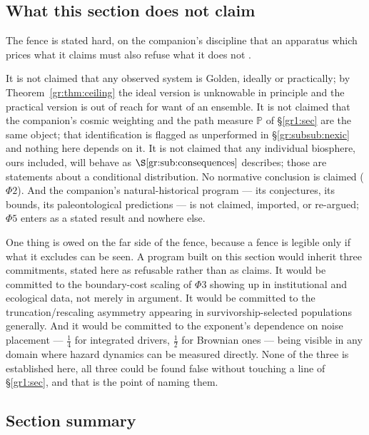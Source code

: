 \documentclass[11pt]{article}
\numberwithin{equation}{section}
\theoremstyle{plain}
\theoremstyle{definition}
\theoremstyle{remark}
\newcommand{\PP}{\mathbb{P}}
\begin{document}
\subsection{What this section does not claim}\label{gr:sub:fence}

The fence is stated hard, on the companion's discipline that an
apparatus which prices what it claims must also refuse what it does not
\cite{Ben26Optimal}.

It is not claimed that any observed system is Golden, ideally or
practically; by Theorem~\ref{gr:thm:ceiling} the ideal version is
unknowable in principle and the practical version is out of reach for
want of an ensemble. It is not claimed that the companion's cosmic
weighting and the path measure $\PP$ of
\S\ref{gr1:sec} are the same object; that
identification is flagged as unperformed in
\S\ref{gr:subsub:nexic} and nothing here depends on it. It is not
claimed that any individual biosphere, ours included, will behave as
$\S\ref{gr:sub:consequences}$ describes; those are statements about a
conditional distribution. No normative conclusion is claimed
($\Phi2$). And the companion's natural-historical program --- its
conjectures, its bounds, its paleontological predictions --- is not
claimed, imported, or re-argued; $\Phi5$ enters as a stated result and
nowhere else.

One thing is owed on the far side of the fence, because a fence is
legible only if what it excludes can be seen. A program built on this
section would inherit three commitments, stated here as refusable rather
than as claims. It would be committed to the boundary-cost scaling of
$\Phi3$ showing up in institutional and ecological data, not merely in
argument. It would be committed to the truncation/rescaling asymmetry
appearing in survivorship-selected populations generally. And it would
be committed to the exponent's dependence on noise placement --- $\tfrac14$
for integrated drivers, $\tfrac12$ for Brownian ones --- being visible
in any domain where hazard dynamics can be measured directly. None of
the three is established here, all three could be found false without
touching a line of \S\ref{gr1:sec}, and that is the
point of naming them.

\subsection*{Section summary}
\end{document}
